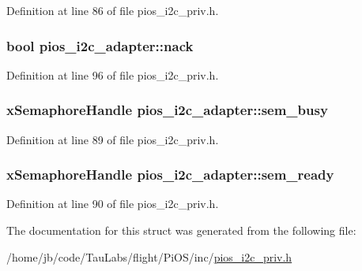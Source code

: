 \-Definition at line 86 of file pios\-\_\-i2c\-\_\-priv.\-h.

\hypertarget{structpios__i2c__adapter_a22998be1ea282fe23fcd44c2b559c987}{
\subsubsection[{nack}]{\setlength{\rightskip}{0pt plus 5cm}bool {\bf pios\-\_\-i2c\-\_\-adapter\-::nack}}}\label{structpios__i2c__adapter_a22998be1ea282fe23fcd44c2b559c987}


\-Definition at line 96 of file pios\-\_\-i2c\-\_\-priv.\-h.

\hypertarget{structpios__i2c__adapter_ae21b610793f476b61cedafa82fffc493}{
\subsubsection[{sem\-\_\-busy}]{\setlength{\rightskip}{0pt plus 5cm}x\-Semaphore\-Handle {\bf pios\-\_\-i2c\-\_\-adapter\-::sem\-\_\-busy}}}\label{structpios__i2c__adapter_ae21b610793f476b61cedafa82fffc493}


\-Definition at line 89 of file pios\-\_\-i2c\-\_\-priv.\-h.

\hypertarget{structpios__i2c__adapter_a8a95bc22396c17869efa5a587a1bd5dc}{
\subsubsection[{sem\-\_\-ready}]{\setlength{\rightskip}{0pt plus 5cm}x\-Semaphore\-Handle {\bf pios\-\_\-i2c\-\_\-adapter\-::sem\-\_\-ready}}}\label{structpios__i2c__adapter_a8a95bc22396c17869efa5a587a1bd5dc}


\-Definition at line 90 of file pios\-\_\-i2c\-\_\-priv.\-h.



\-The documentation for this struct was generated from the following file\-:\begin{DoxyCompactItemize}
\item 
/home/jb/code/\-Tau\-Labs/flight/\-Pi\-O\-S/inc/\hyperlink{pios__i2c__priv_8h}{pios\-\_\-i2c\-\_\-priv.\-h}\end{DoxyCompactItemize}
